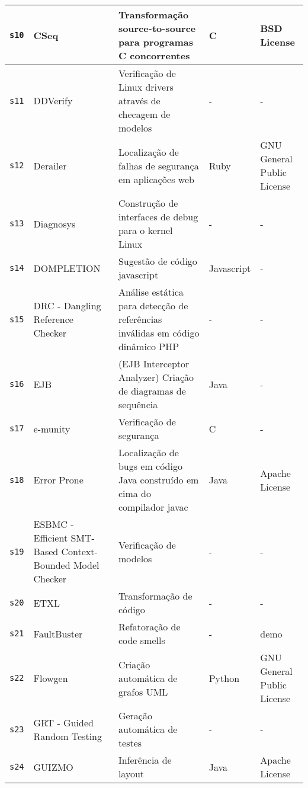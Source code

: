 \begin{longtable}{| l | p{4.5cm} | p{7cm} | p{2.5cm} | p{2.5cm} |}
    \hline
    \texttt{s10} &
      CSeq &
      Transformação source-to-source para programas C concorrentes &
      C &
      BSD License \\
    \hline
    \texttt{s11} &
      DDVerify &
      Verificação de Linux drivers através de checagem de modelos &
      - &
      - \\
    \hline
    \texttt{s12} &
      Derailer &
      Localização de falhas de segurança em aplicações web &
      Ruby &
      GNU General Public License \\
    \hline
    \texttt{s13} &
      Diagnosys &
      Construção de interfaces de debug para o kernel Linux &
      - &
      - \\
    \hline
    \texttt{s14} &
      DOMPLETION &
      Sugestão de código javascript &
      Javascript &
      - \\
    \hline
    \texttt{s15} &
      DRC - Dangling Reference Checker &
      Análise estática para detecção de referências inválidas em código dinâmico PHP &
      - &
      - \\
    \hline
    \texttt{s16} &
      EJB &
      (EJB Interceptor Analyzer) Criação de diagramas de sequência &
      Java &
      - \\
    \hline
    \texttt{s17} &
      e-munity &
      Verificação de segurança &
      C &
      - \\
    \hline
    \texttt{s18} &
      Error Prone &
      Localização de bugs em código Java construído em cima do compilador javac &
      Java &
      Apache License \\
    \hline
    \texttt{s19} &
      ESBMC - Efficient SMT-Based Context-Bounded Model Checker &
      Verificação de modelos &
      - &
      - \\
    \hline
    \texttt{s20} &
      ETXL &
      Transformação de código &
      - &
      - \\
    \hline
    \texttt{s21} &
      FaultBuster &
      Refatoração de code smells &
      - &
      demo \\
    \hline
    \texttt{s22} &
      Flowgen &
      Criação automática de grafos UML &
      Python &
      GNU General Public License \\
    \hline
    \texttt{s23} &
      GRT - Guided Random Testing &
      Geração automática de testes &
      - &
      - \\
    \hline
    \texttt{s24} &
      GUIZMO &
      Inferência de layout &
      Java &
      Apache License \\
    \hline

\end{longtable}
